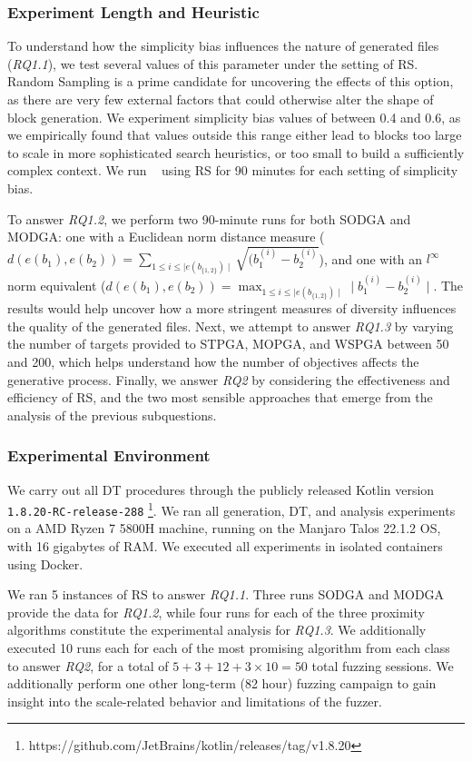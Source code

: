 \subsubsection{Experiment Length and Heuristic}

To understand how the simplicity bias influences the nature
of generated files (\textit{RQ1.1}), we test several values of this parameter under
the setting of \gls{RS}.
Random Sampling is a prime candidate for uncovering the effects of this
option, as there are very few external factors that could otherwise alter
the shape of block generation.
We experiment simplicity bias values of between 0.4 and 0.6, as we empirically found
that values outside this range either lead to blocks too large to scale in
more sophisticated search heuristics, or too small to build a sufficiently
complex context.
We run \kf~ using \gls{RS} for 90 minutes for each setting of simplicity bias.

To answer \textit{RQ1.2}, we perform two 90-minute runs for both \gls{SODGA} and \gls{MODGA}:
one with a Euclidean norm distance measure ($d(e(b_1), e(b_2)) =
\sum_{1 \leq i \leq \mid e(b_{\{1,2\}}) \mid} \sqrt{(b_1^{(i)} - b_2^{(i)}}$),
and one with an $l^\infty$ norm equivalent ($d(e(b_1), e(b_2)) =
\max_{1 \leq i \leq \mid e(b_{\{1,2\}}) \mid} \mid b_1^{(i)} - b_2^{(i)} \mid$.
The results would help uncover how a more stringent measures of diversity
influences the quality of the generated files.
Next, we attempt to answer \textit{RQ1.3} by varying the number of targets provided
to \gls{STPGA}, \gls{MOPGA}, and \gls{WSPGA} between 50 and 200, which
helps understand how the number of objectives affects
the generative process.
Finally, we answer \textit{RQ2} by considering the effectiveness and efficiency
of \gls{RS}, and the two most sensible approaches that emerge from the analysis of the
previous subquestions.

\subsubsection{Experimental Environment}

We carry out all \gls{DT} procedures through the publicly released
Kotlin version \texttt{1.8.20-RC-release-288}
\footnote{https://github.com/JetBrains/kotlin/releases/tag/v1.8.20}.
We ran all generation, \gls{DT}, and analysis experiments on a
AMD Ryzen 7 5800H machine, running on the Manjaro Talos 22.1.2
\gls{OS}, with 16 gigabytes of RAM.
We executed all experiments in isolated containers using Docker.

We ran 5 instances of \gls{RS} to answer \textit{RQ1.1}.
Three runs \gls{SODGA} and \gls{MODGA} provide the data for \textit{RQ1.2},
while four runs for each of the three proximity algorithms constitute the experimental
analysis for \textit{RQ1.3}.
We additionally executed 10 runs each for each of the most promising algorithm
from each class to answer \textit{RQ2},
for a total of $5 + 3 + 12 + 3 \times 10 = 50$ total fuzzing sessions.
We additionally perform one other long-term (82 hour) fuzzing campaign to
gain insight into the scale-related behavior and limitations of the fuzzer.